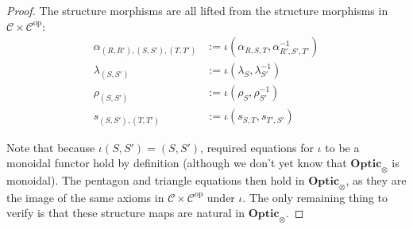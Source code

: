 \documentclass[11pt,letterpaper]{article}
\theoremstyle{plain}
\theoremstyle{definition}
\newcommand{\C}{\mathscr{C}}
\newcommand{\Optic}{\mathbf{Optic}}
\newcommand{\op}{\mathrm{op}}
\newcommand{\todo}[1]{\textcolor{red}{\small #1}}
\begin{document}
\begin{proof}

  The structure morphisms are all lifted from the structure morphisms in $\C \times \C^\op$:
  \begin{align*}
    \alpha_{(R, R'), (S, S'), (T, T')} &:= \iota(\alpha_{R,S,T}, \alpha_{R',S',T'}^{-1}) \\
    \lambda_{(S, S')} &:= \iota(\lambda_{S}, \lambda_{S'}^{-1}) \\
    \rho_{(S, S')} &:= \iota(\rho_{S}, \rho_{S'}^{-1}) \\
    s_{(S, S'), (T, T')} &:= \iota(s_{S, T}, s_{T', S'})
  \end{align*}

  Note that because $\iota(S, S') = (S, S')$, required equations for $\iota$ to be a monoidal functor hold by definition (although we don't yet know that $\Optic_\otimes$ is monoidal). The pentagon and triangle equations then hold in $\Optic_\otimes$, as they are the image of the same axioms in $\C \times \C^\op$ under $\iota$. The only remaining thing to verify is that these structure maps are natural in $\Optic_\otimes$.


\end{proof}
\end{document}

